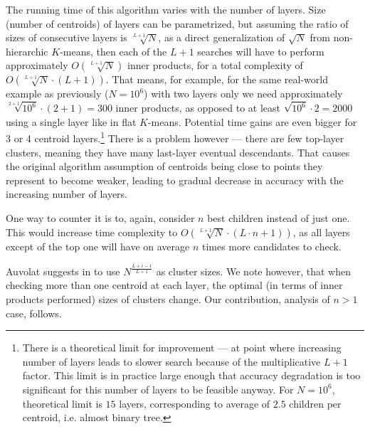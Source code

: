 The running time of this algorithm varies with the number of layers. Size (number of
centroids) of layers can be parametrized, but assuming
the ratio of sizes of consecutive layers is $ \sqrt[L+1]{N} $, as a direct generalization
of $ \sqrt{N} $ from non-hierarchic $K$-means,
then each of the $ L + 1 $ searches will have to perform approximately
$ O(\sqrt[L+1]{N}) $ inner products, for a total complexity of
$ O(\sqrt[L+1]{N} \cdot (L + 1)) $. That means, for example, for the same real-world
example as previously ($ N=10^6 $) with two layers only we need approximately
$ \sqrt[2+1]{10^6} \cdot (2 + 1) = 300 $ inner products, as opposed
to at least $ \sqrt{10^6} \cdot 2 = 2000 $ using a single layer like in flat $K$-means.
Potential time gains are even bigger for 3 or 4 centroid layers.\footnote{
There is a theoretical limit for improvement --- at point where increasing
number of layers leads to slower search because of the multiplicative $L+1$ factor.
This limit is in practice large enough that accuracy degradation is too 
significant for this number of layers to be feasible anyway. 
For $N=10^6$, theoretical limit is $15$ layers, corresponding to average 
of $2.5$ children per centroid, i.e. almost binary tree.
} There is a problem however --- there are few top-layer clusters,
meaning they have many last-layer eventual descendants. That causes the
original algorithm assumption of centroids being close to points they represent
to become weaker, leading to gradual decrease in accuracy with the increasing number of layers.


One way to counter it is to, again, consider $n$ best children instead of
just one. This would increase time complexity to 
$ O(\sqrt[L+1]{N} \cdot (L \cdot n + 1)) $, as all layers except of the top one
will have on average $n$ times more candidates to check.

Auvolat suggests in \cite{kmeans} to use $N^{\frac{L+i-1}{L+1}}$ as cluster
sizes. We note however, that when checking more than one centroid at each layer, 
the optimal (in terms
of inner products performed) sizes of clusters change. Our contribution,
analysis of $n>1$ case, follows.

